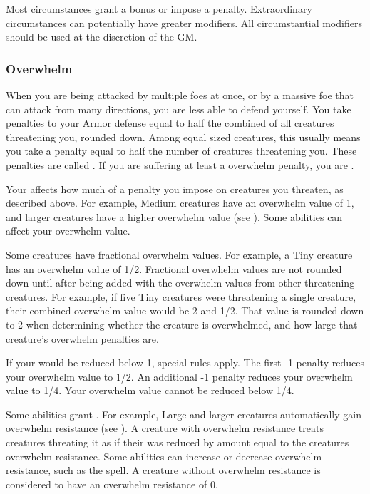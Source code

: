             Most circumstances grant a  bonus or impose a  penalty.
            Extraordinary circumstances can potentially have greater modifiers.
            All circumstantial modifiers should be used at the discretion of the GM.\@

        \subsubsection{Overwhelm}\label{Overwhelm}
            When you are being attacked by multiple foes at once, or by a massive foe that can attack from many directions, you are less able to defend yourself.
            You take penalties to your Armor defense equal to half the combined  of all creatures threatening you, rounded down.
            Among equal sized creatures, this usually means you take a penalty equal to half the number of creatures threatening you.
            These penalties are called .
            If you are suffering at least a  overwhelm penalty, you are .

            \label{Overwhelm Value} Your  affects how much of a penalty you impose on creatures you threaten, as described above.
            For example, Medium creatures have an overwhelm value of 1, and larger creatures have a higher overwhelm value (see ).
            Some abilities can affect your overwhelm value.

            Some creatures have fractional overwhelm values.
            For example, a Tiny creature has an overwhelm value of 1/2.
            Fractional overwhelm values are not rounded down until after being added with the overwhelm values from other threatening creatures.
            For example, if five Tiny creatures were threatening a single creature, their combined overwhelm value would be 2 and 1/2.
            That value is rounded down to 2 when determining whether the creature is overwhelmed, and how large that creature's overwhelm penalties are.

            If your  would be reduced below 1, special rules apply.
            The first -1 penalty reduces your overwhelm value to 1/2.
            An additional -1 penalty reduces your overwhelm value to 1/4.
            Your overwhelm value cannot be reduced below 1/4.

            \label{Overwhelm Resistance} Some abilities grant .
            For example, Large and larger creatures automatically gain overwhelm resistance (see ).
            A creature with overwhelm resistance treats creatures threating it as if their  was reduced by amount equal to the creatures overwhelm resistance.
            Some abilities can increase or decrease overwhelm resistance, such as the  spell.
            A creature without overwhelm resistance is considered to have an overwhelm resistance of 0.

